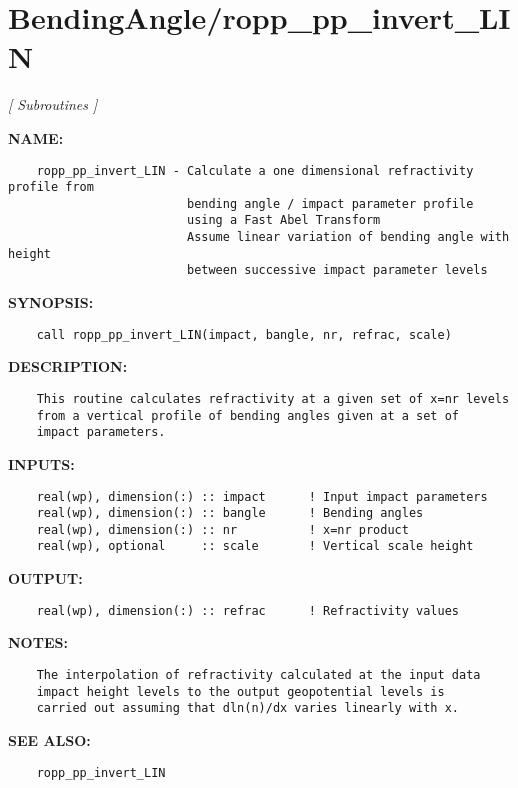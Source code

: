 \section{BendingAngle/ropp\_pp\_invert\_LIN}
\textsl{[ Subroutines ]}

\label{ch:robo3}
\label{ch:BendingAngle_ropp_pp_invert_LIN}
\textbf{NAME:}\hspace{0.08in}\begin{Verbatim}
    ropp_pp_invert_LIN - Calculate a one dimensional refractivity profile from
                         bending angle / impact parameter profile
                         using a Fast Abel Transform
                         Assume linear variation of bending angle with height
                         between successive impact parameter levels
\end{Verbatim}
\textbf{SYNOPSIS:}\hspace{0.08in}\begin{Verbatim}
    call ropp_pp_invert_LIN(impact, bangle, nr, refrac, scale)
\end{Verbatim}
\textbf{DESCRIPTION:}\hspace{0.08in}\begin{Verbatim}
    This routine calculates refractivity at a given set of x=nr levels
    from a vertical profile of bending angles given at a set of
    impact parameters.
\end{Verbatim}
\textbf{INPUTS:}\hspace{0.08in}\begin{Verbatim}
    real(wp), dimension(:) :: impact      ! Input impact parameters 
    real(wp), dimension(:) :: bangle      ! Bending angles
    real(wp), dimension(:) :: nr          ! x=nr product
    real(wp), optional     :: scale       ! Vertical scale height
\end{Verbatim}
\textbf{OUTPUT:}\hspace{0.08in}\begin{Verbatim}
    real(wp), dimension(:) :: refrac      ! Refractivity values
\end{Verbatim}
\textbf{NOTES:}\hspace{0.08in}\begin{Verbatim}
    The interpolation of refractivity calculated at the input data
    impact height levels to the output geopotential levels is
    carried out assuming that dln(n)/dx varies linearly with x.
\end{Verbatim}
\textbf{SEE ALSO:}\hspace{0.08in}\begin{Verbatim}
    ropp_pp_invert_LIN
\end{Verbatim}
